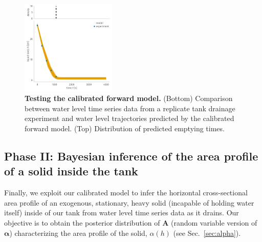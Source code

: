 \documentclass[a4paper,fleqn]{cas-dc}
\begin{document}
\begin{figure}[h!]
    \centering
    	\includegraphics[width=0.4\textwidth]{test.pdf}
    \caption{
      \textbf{Testing the calibrated forward model.}
      (Bottom) Comparison between water level time series data from a replicate tank drainage experiment and water level trajectories predicted by the calibrated forward model. 
      (Top) Distribution of predicted emptying times.
      } \label{fig:test}
\end{figure}

\subsection{Phase II: Bayesian inference of the area profile of a solid inside the tank} \label{sec:phaseII}
Finally, we exploit our calibrated model to infer the horizontal cross-sectional area profile of an exogenous, stationary, heavy solid (incapable of holding water itself) inside of our tank from water level time series data as it drains.
Our objective is to obtain the posterior distribution of $\mathbf{A}$ (random variable version of $\boldsymbol \alpha$) characterizing the area profile of the solid, $\alpha(h)$ (see Sec.~\ref{sec:alpha}).
\end{document}
